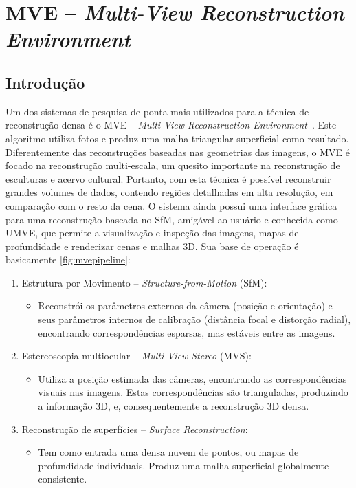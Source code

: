 \section{MVE -- \emph{Multi-View Reconstruction Environment}}\label{sec:mve}
%
\subsection{Introdução}
Um dos sistemas de pesquisa de ponta mais utilizados para a técnica de reconstrução densa é o MVE --
\emph{Multi-View Reconstruction Environment}~\cite{mve}. Este algoritmo utiliza
fotos e produz uma malha triangular superficial como resultado. Diferentemente
das reconstruções baseadas nas geometrias das imagens, o MVE é focado na
reconstrução multi-escala, um quesito importante na reconstrução de esculturas e
acervo cultural. Portanto, com esta técnica é possível reconstruir grandes
volumes de dados, contendo regiões detalhadas em alta resolução, em comparação
com o resto da cena. O sistema ainda possui uma interface gráfica para uma
reconstrução baseada no SfM, amigável ao usuário e conhecida como UMVE, que
permite a visualização e inspeção das imagens, mapas de profundidade e
renderizar cenas e malhas 3D. Sua base de operação é basicamente
\ref{fig:mvepipeline}:
\begin{enumerate}
\item{Estrutura por Movimento -- \emph{Structure-from-Motion} (SfM):}

\begin{itemize}
\item{
Reconstrói os parâmetros externos da câmera (posição e orientação) e seus
parâmetros internos de calibração (distância focal e distorção radial), encontrando correspondências
esparsas, mas estáveis entre as imagens.
}
\end{itemize}

\item{Estereoscopia multiocular -- \emph{Multi-View Stereo} (MVS):}
\begin{itemize}
\item{
Utiliza a posição estimada das câmeras, encontrando as correspondências visuais
nas imagens. Estas correspondências são trianguladas, produzindo a informação
3D, e, consequentemente a reconstrução 3D densa.
} 
\end{itemize}
\item{Reconstrução de superfícies -- \emph{Surface Reconstruction}:}
\begin{itemize}
\item{
Tem como entrada uma densa nuvem de pontos, ou mapas de profundidade
individuais. Produz uma malha superficial globalmente consistente.
}
\end{itemize}
\end{enumerate}

